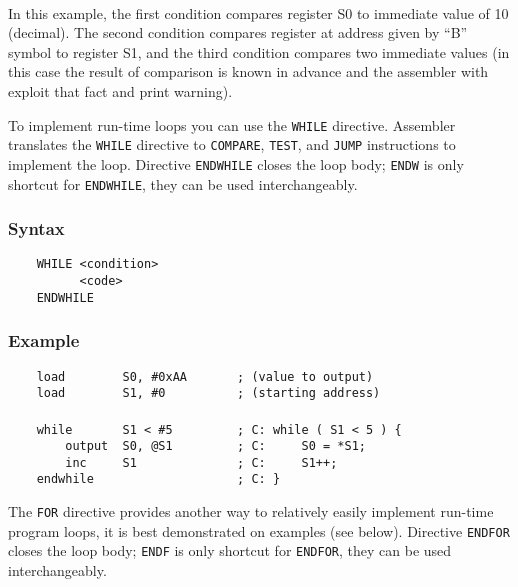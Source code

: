             ~\\In this example, the first condition compares register S0 to immediate value of 10 (decimal). The second condition compares register at address given by ``B'' symbol to register S1, and the third condition compares two immediate values (in this case the result of comparison is known in advance and the assembler with exploit that fact and print warning).

    \clearpage
        To implement run-time loops you can use the \texttt{WHILE} directive. Assembler translates the \texttt{WHILE} directive to \texttt{COMPARE}, \texttt{TEST}, and \texttt{JUMP} instructions to implement the loop. Directive \texttt{ENDWHILE} closes the loop body; \texttt{ENDW} is only shortcut for \texttt{ENDWHILE}, they can be used interchangeably.

        \subsubsection{Syntax}
            \verb'    WHILE <condition>'\\
            \verb'          <code>'\\
            \verb'    ENDWHILE'

        \subsubsection{Example}
            \verb'    load        S0, #0xAA       ; (value to output)'\\
            \verb'    load        S1, #0          ; (starting address)'\\
            \verb''\\
            \verb'    while       S1 < #5         ; C: while ( S1 < 5 ) {'\\
            \verb'        output  S0, @S1         ; C:     S0 = *S1;'\\
            \verb'        inc     S1              ; C:     S1++;'\\
            \verb'    endwhile                    ; C: }'

    \clearpage
        The \texttt{FOR} directive provides another way to relatively easily implement run-time program loops, it is best demonstrated on examples (see below). Directive \texttt{ENDFOR} closes the loop body; \texttt{ENDF} is only shortcut for \texttt{ENDFOR}, they can be used interchangeably.

